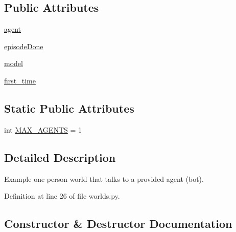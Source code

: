 \subsection*{Public Attributes}
\begin{DoxyCompactItemize}
\item 
\hyperlink{classparlai_1_1messenger_1_1tasks_1_1chatbot_1_1worlds_1_1MessengerBotChatTaskWorld_ae6cb9315b1f72666d357796ab21345d9}{agent}
\item 
\hyperlink{classparlai_1_1messenger_1_1tasks_1_1chatbot_1_1worlds_1_1MessengerBotChatTaskWorld_ae658c900e800e43f6eae12ceea29bf44}{episode\+Done}
\item 
\hyperlink{classparlai_1_1messenger_1_1tasks_1_1chatbot_1_1worlds_1_1MessengerBotChatTaskWorld_a5095a8564c6a63301654862915e1403a}{model}
\item 
\hyperlink{classparlai_1_1messenger_1_1tasks_1_1chatbot_1_1worlds_1_1MessengerBotChatTaskWorld_a9987ef85470376e358479e6a44a62b49}{first\+\_\+time}
\end{DoxyCompactItemize}
\subsection*{Static Public Attributes}
\begin{DoxyCompactItemize}
\item 
int \hyperlink{classparlai_1_1messenger_1_1tasks_1_1chatbot_1_1worlds_1_1MessengerBotChatTaskWorld_aaa378c9c3200d4b4483a4bf03506f719}{M\+A\+X\+\_\+\+A\+G\+E\+N\+TS} = 1
\end{DoxyCompactItemize}


\subsection{Detailed Description}
\begin{DoxyVerb}Example one person world that talks to a provided agent (bot).\end{DoxyVerb}
 

Definition at line 26 of file worlds.\+py.



\subsection{Constructor \& Destructor Documentation}
\mbox{\label{classparlai_1_1messenger_1_1tasks_1_1chatbot_1_1worlds_1_1MessengerBotChatTaskWorld_a6b6d558d3d6438b34eac412b315524bc}} 
